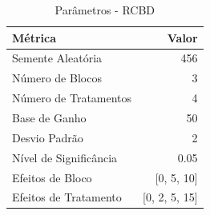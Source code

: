 \begin{table}[H]
\centering
\caption{Parâmetros - RCBD}
\label{tab:parametros_rcbd}
\begin{tabular}{|l|r|}
\hline
\textbf{Métrica} & \textbf{Valor} \\
\hline
Semente Aleatória & 456 \\
Número de Blocos & 3 \\
Número de Tratamentos & 4 \\
Base de Ganho & 50 \\
Desvio Padrão & 2 \\
Nível de Significância & 0.05 \\
Efeitos de Bloco & [0, 5, 10] \\
Efeitos de Tratamento & [0, 2, 5, 15] \\
\hline
\end{tabular}
\end{table}
